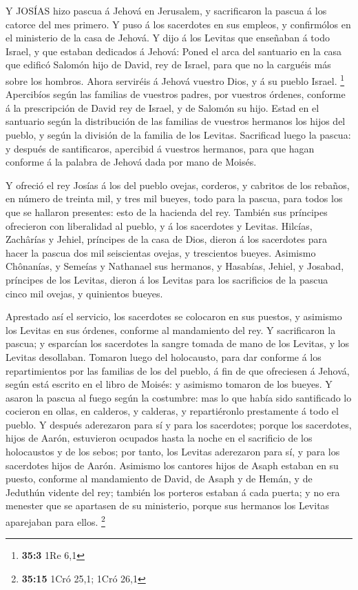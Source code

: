  Y JOSÍAS hizo pascua á Jehová en Jerusalem, y sacrificaron
la pascua á los catorce del mes primero.  Y puso á los
sacerdotes en sus empleos, y confirmólos en el ministerio de la casa de
Jehová.  Y dijo á los Levitas que enseñaban á todo Israel, y
que estaban dedicados á Jehová: Poned el arca del santuario en la casa
que edificó Salomón hijo de David, rey de Israel, para que no la
carguéis más sobre los hombros. Ahora serviréis á Jehová vuestro Dios, y
á su pueblo Israel. \footnote{\textbf{35:3} 1Re 6,1} 
Apercibíos según las familias de vuestros padres, por vuestros órdenes,
conforme á la prescripción de David rey de Israel, y de Salomón su hijo.
 Estad en el santuario según la distribución de las familias
de vuestros hermanos los hijos del pueblo, y según la división de la
familia de los Levitas.  Sacrificad luego la pascua: y
después de santificaros, apercibid á vuestros hermanos, para que hagan
conforme á la palabra de Jehová dada por mano de Moisés.

 Y ofreció el rey Josías á los del pueblo ovejas, corderos,
y cabritos de los rebaños, en número de treinta mil, y tres mil bueyes,
todo para la pascua, para todos los que se hallaron presentes: esto de
la hacienda del rey.  También sus príncipes ofrecieron con
liberalidad al pueblo, y á los sacerdotes y Levitas. Hilcías, Zachârías
y Jehiel, príncipes de la casa de Dios, dieron á los sacerdotes para
hacer la pascua dos mil seiscientas ovejas, y trescientos bueyes.
 Asimismo Chônanías, y Semeías y Nathanael sus hermanos, y
Hasabías, Jehiel, y Josabad, príncipes de los Levitas, dieron á los
Levitas para los sacrificios de la pascua cinco mil ovejas, y quinientos
bueyes.

 Aprestado así el servicio, los sacerdotes se colocaron en
sus puestos, y asimismo los Levitas en sus órdenes, conforme al
mandamiento del rey.  Y sacrificaron la pascua; y esparcían
los sacerdotes la sangre tomada de mano de los Levitas, y los Levitas
desollaban.  Tomaron luego del holocausto, para dar
conforme á los repartimientos por las familias de los del pueblo, á fin
de que ofreciesen á Jehová, según está escrito en el libro de Moisés: y
asimismo tomaron de los bueyes.  Y asaron la pascua al
fuego según la costumbre: mas lo que había sido santificado lo cocieron
en ollas, en calderos, y calderas, y repartiéronlo prestamente á todo el
pueblo.  Y después aderezaron para sí y para los
sacerdotes; porque los sacerdotes, hijos de Aarón, estuvieron ocupados
hasta la noche en el sacrificio de los holocaustos y de los sebos; por
tanto, los Levitas aderezaron para sí, y para los sacerdotes hijos de
Aarón.  Asimismo los cantores hijos de Asaph estaban en su
puesto, conforme al mandamiento de David, de Asaph y de Hemán, y de
Jeduthún vidente del rey; también los porteros estaban á cada puerta; y
no era menester que se apartasen de su ministerio, porque sus hermanos
los Levitas aparejaban para ellos. \footnote{\textbf{35:15} 1Cró 25,1;
  1Cró 26,1}

